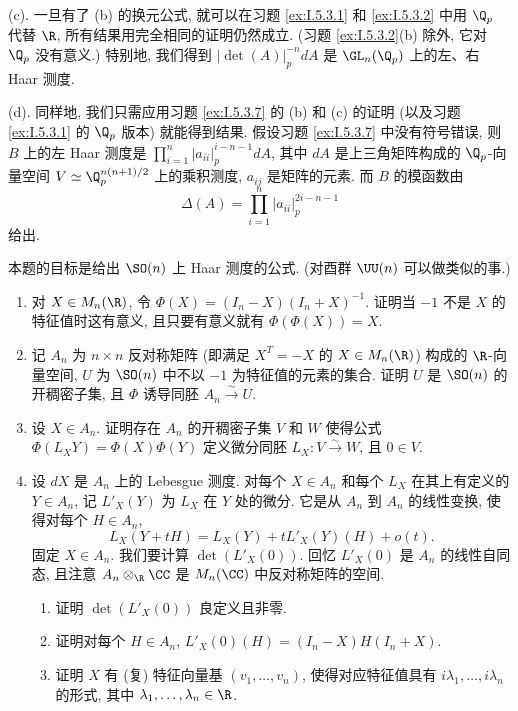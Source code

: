 \begin{solution}
(c). 一旦有了 (b) 的换元公式, 就可以在习题 \ref{ex:I.5.3.1} 和 \ref{ex:I.5.3.2} 中用 $\Q_p$ 代替 $\R$, 所有结果用完全相同的证明仍然成立. (习题 \ref{ex:I.5.3.2}(b) 除外, 它对 $\Q_p$ 没有意义.) 特别地, 我们得到 $|\det(A)|_p^{-n}dA$ 是 $\GL_n(\Q_p)$ 上的左、右 Haar 测度.

(d). 同样地, 我们只需应用习题 \ref{ex:I.5.3.7} 的 (b) 和 (c) 的证明 (以及习题 \ref{ex:I.5.3.1} 的 $\Q_p$ 版本) 就能得到结果. 假设习题 \ref{ex:I.5.3.7} 中没有符号错误, 则 $B$ 上的左 Haar 测度是 $\prod_{i=1}^n|a_{ii}|_p^{i-n-1}dA$, 其中 $dA$ 是上三角矩阵构成的 $\Q_p$-向量空间 $V \simeq \Q_p^{n(n+1)/2}$ 上的乘积测度, $a_{ij}$ 是矩阵的元素. 而 $B$ 的模函数由
\[
\Delta(A) = \prod_{i=1}^n|a_{ii}|_p^{2i-n-1}
\]
给出.
\end{solution}

\begin{exercise}[$\SO(n)$ 上的 Haar 测度]
\label{ex:I.5.3.9}
本题的目标是给出 $\SO(n)$ 上 Haar 测度的公式. (对酉群 $\UU(n)$ 可以做类似的事.)
\begin{enumerate}
\item[(a)] 对 $X \in M_n(\R)$, 令 $\Phi(X) = (I_n - X)(I_n + X)^{-1}$. 证明当 $-1$ 不是 $X$ 的特征值时这有意义, 且只要有意义就有 $\Phi(\Phi(X)) = X$.
\item[(b)] 记 $A_n$ 为 $n \times n$ 反对称矩阵 (即满足 $X^T = -X$ 的 $X \in M_n(\R)$) 构成的 $\R$-向量空间, $U$ 为 $\SO(n)$ 中不以 $-1$ 为特征值的元素的集合. 证明 $U$ 是 $\SO(n)$ 的开稠密子集, 且 $\Phi$ 诱导同胚 $A_n \xrightarrow{\sim} U$.
\item[(c)] 设 $X \in A_n$. 证明存在 $A_n$ 的开稠密子集 $V$ 和 $W$ 使得公式 $\Phi(L_XY) = \Phi(X)\Phi(Y)$ 定义微分同胚 $L_X \colon V \xrightarrow{\sim} W$, 且 $0 \in V$.
\item[(d)] 设 $dX$ 是 $A_n$ 上的 Lebesgue 测度. 对每个 $X \in A_n$ 和每个 $L_X$ 在其上有定义的 $Y \in A_n$, 记 $L'_X(Y)$ 为 $L_X$ 在 $Y$ 处的微分. 它是从 $A_n$ 到 $A_n$ 的线性变换, 使得对每个 $H \in A_n$,
\[
L_X(Y + tH) = L_X(Y) + tL'_X(Y)(H) + o(t).
\]
固定 $X \in A_n$. 我们要计算 $\det(L'_X(0))$. 回忆 $L'_X(0)$ 是 $A_n$ 的线性自同态, 且注意 $A_n \otimes_{\R}\CC$ 是 $M_n(\CC)$ 中反对称矩阵的空间.
\begin{enumerate}
\item[(i)] 证明 $\det(L'_X(0))$ 良定义且非零.
\item[(ii)] 证明对每个 $H \in A_n$, $L'_X(0)(H) = (I_n - X)H(I_n + X)$.
\item[(iii)] 证明 $X$ 有 (复) 特征向量基 $(v_1, \ldots, v_n)$, 使得对应特征值具有 $i\lambda_1, \ldots, i\lambda_n$ 的形式, 其中 $\lambda_1, \ldots, \lambda_n \in \R$.

\end{enumerate}
\end{enumerate}
\end{exercise}
